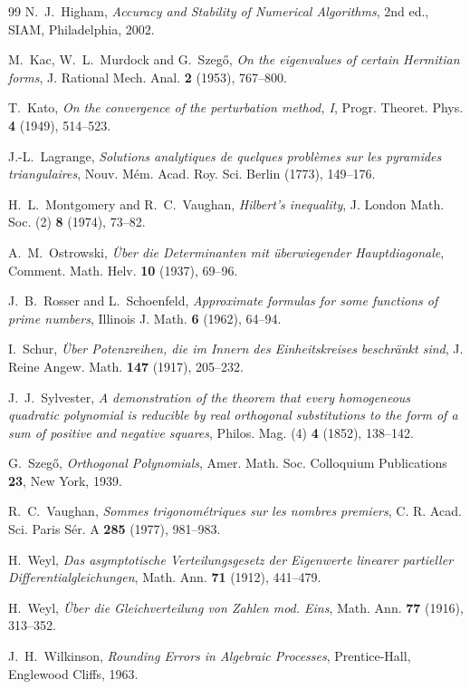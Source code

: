 \documentclass[11pt,a4paper]{article}
\theoremstyle{plain}
\theoremstyle{definition}
\begin{document}
\begin{thebibliography}{99}
 N.~J.~Higham,
\emph{Accuracy and Stability of Numerical Algorithms}, 2nd ed., SIAM,
Philadelphia, 2002.

 M.~Kac, W.~L.~Murdock and G.~Szeg\H{o},
\emph{On the eigenvalues of certain Hermitian forms},
J. Rational Mech. Anal. \textbf{2} (1953), 767--800.

 T.~Kato,
\emph{On the convergence of the perturbation method, I},
Progr. Theoret. Phys. \textbf{4} (1949), 514--523.

 J.-L.~Lagrange,
\emph{Solutions analytiques de quelques probl\`emes sur les pyramides
triangulaires},
Nouv. M\'em. Acad. Roy. Sci. Berlin (1773), 149--176.

 H.~L.~Montgomery and R.~C.~Vaughan,
\emph{Hilbert's inequality},
J. London Math. Soc. (2) \textbf{8} (1974), 73--82.

 A.~M.~Ostrowski,
\emph{\"Uber die Determinanten mit \"uberwiegender Hauptdiagonale},
Comment. Math. Helv. \textbf{10} (1937), 69--96.

 J.~B.~Rosser and L.~Schoenfeld,
\emph{Approximate formulas for some functions of prime numbers},
Illinois J. Math. \textbf{6} (1962), 64--94.

 I.~Schur,
\emph{\"Uber Potenzreihen, die im Innern des Einheitskreises beschr\"ankt
sind},
J. Reine Angew. Math. \textbf{147} (1917), 205--232.

 J.~J.~Sylvester,
\emph{A demonstration of the theorem that every homogeneous quadratic polynomial
is reducible by real orthogonal substitutions to the form of a sum of positive
and negative squares},
Philos. Mag. (4) \textbf{4} (1852), 138--142.

 G.~Szeg\H{o},
\emph{Orthogonal Polynomials},
Amer. Math. Soc. Colloquium Publications \textbf{23}, New York, 1939.

 R.~C.~Vaughan,
\emph{Sommes trigonom\'etriques sur les nombres premiers},
C. R. Acad. Sci. Paris S\'er. A \textbf{285} (1977), 981--983.

 H.~Weyl,
\emph{Das asymptotische Verteilungsgesetz der Eigenwerte linearer partieller
Differentialgleichungen},
Math. Ann. \textbf{71} (1912), 441--479.

 H.~Weyl,
\emph{\"Uber die Gleichverteilung von Zahlen mod. Eins},
Math. Ann. \textbf{77} (1916), 313--352.

 J.~H.~Wilkinson,
\emph{Rounding Errors in Algebraic Processes},
Prentice-Hall, Englewood Cliffs, 1963.

\end{thebibliography}
\end{document}
